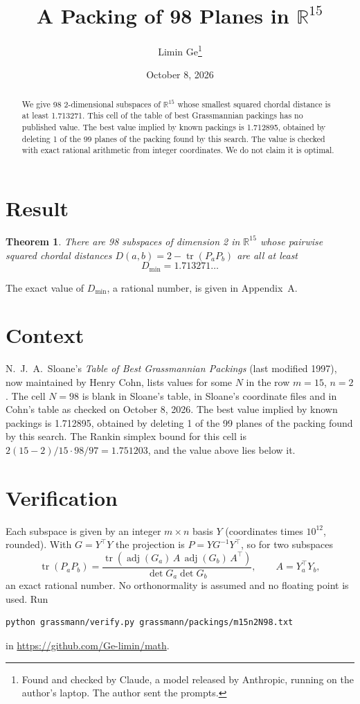 \documentclass[11pt,a4paper]{article}
\title{A Packing of 98 Planes in $\mathbb{R}^{15}$}
\author{Limin Ge\thanks{Found and checked by Claude, a model released by Anthropic, running on the author's laptop. The author sent the prompts.}}
\date{October 8, 2026}
\newtheorem*{theorem}{Theorem}
\begin{document}
\maketitle
\begin{abstract}
We give 98 2-dimensional subspaces of $\mathbb{R}^{15}$ whose smallest squared chordal distance is at least 1.713271. This cell of the table of best Grassmannian packings has no published value. The best value implied by known packings is 1.712895, obtained by deleting 1 of the 99 planes of the packing found by this search. The value is checked with exact rational arithmetic from integer coordinates. We do not claim it is optimal.
\end{abstract}

\section{Result}
\begin{theorem}
There are 98 subspaces of dimension 2 in $\mathbb{R}^{15}$ whose pairwise squared chordal distances $D(a,b) = 2 - \operatorname{tr}(P_aP_b)$ are all at least
\[ D_{\min} = 1.713271\ldots \]
\end{theorem}
The exact value of $D_{\min}$, a rational number, is given in Appendix~A.


\section{Context}
N.~J.~A.~Sloane's \emph{Table of Best Grassmannian Packings} (last modified 1997), now maintained by Henry Cohn, lists values for some $N$ in the row $m=15$, $n=2$. The cell $N=98$ is blank in Sloane's table, in Sloane's coordinate files and in Cohn's table as checked on October 8, 2026. The best value implied by known packings is 1.712895, obtained by deleting 1 of the 99 planes of the packing found by this search. The Rankin simplex bound for this cell is $2(15-2)/15\cdot 98/97 = 1.751203$, and the value above lies below it.


\section{Verification}
Each subspace is given by an integer $m\times n$ basis $Y$ (coordinates times $10^{12}$, rounded). With $G=Y^\top Y$ the projection is $P=YG^{-1}Y^\top$, so for two subspaces
\[ \operatorname{tr}(P_aP_b)=\frac{\operatorname{tr}(\operatorname{adj}(G_a)\,A\,\operatorname{adj}(G_b)\,A^\top)}{\det G_a\det G_b},\qquad A=Y_a^\top Y_b, \]
an exact rational number. No orthonormality is assumed and no floating point is used. Run
\begin{verbatim}
python grassmann/verify.py grassmann/packings/m15n2N98.txt
\end{verbatim}
in \url{https://github.com/Ge-limin/math}.
\end{document}
